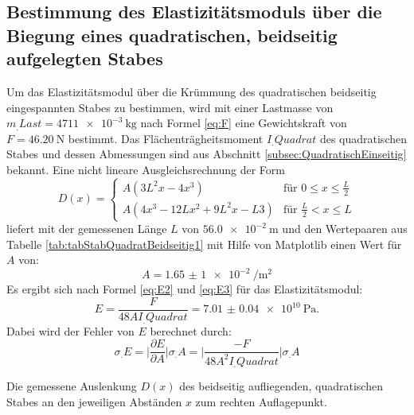 \subsection{Bestimmung des Elastizitätsmoduls über die Biegung eines quadratischen, beidseitig aufgelegten Stabes}

Um das Elastizitätsmodul über die Krümmung des quadratischen beidseitig eingespannten Stabes zu bestimmen, wird mit einer Lastmasse von $m_.{Last} = \SI{4711e-3}{\kilogram}$ nach Formel \eqref{eq:F} eine Gewichtskraft von $F=\SI{46.20}{\newton}$ bestimmt.
Das Flächenträgheitsmoment $I_.{Quadrat}$ des quadratischen Stabes und dessen Abmessungen sind aus Abschnitt \ref{subsec:QuadratischEinseitig} bekannt.
Eine nicht lineare Ausgleichsrechnung der Form
\begin{equation*}
	D(x) =
	\begin{cases}
	A\left(3L^2 x-4x^3\right)& \text{für }0\leq x \leq \frac{L}{2} \\
	A\left(4 x^3 -12 L x^2 + 9 L^2 x -L 3 \right)& \text{für }\frac{L}{2} < x \leq L
	\end{cases} \label{FunktionBeidseitig}
\end{equation*}
liefert mit der gemessenen Länge $L$ von $\SI{56.0e-2}{\metre}$ und den Wertepaaren aus Tabelle \ref{tab:tabStabQuadratBeidseitig1} mit Hilfe von Matplotlib \cite{matplotlib} einen Wert für $A$ von:
\[
	A = \SI{1,65(1)e-2}{\per\metre\squared}
\]
Es ergibt sich nach Formel \eqref{eq:E2} und \eqref{eq:E3} für das Elastizitätsmodul:
\[
	E = \frac{F}{48AI_.{Quadrat}} = \SI{7.01(4)e10}{\pascal}\text{.}
\]
Dabei wird der Fehler von $E$ berechnet durch:
\begin{equation}
	\sigma_.E = \biggl|\frac{\partial E}{\partial A}\biggl|\sigma_.A = \biggl|\frac{-F}{48A^2I_.{Quadrat}}\biggl|\sigma_.A \label{eq:sigma_E}
\end{equation}
\begin{table}
	\caption{Die gemessene Auslenkung $D(x)$ des beidseitig aufliegenden, quadratischen Stabes an den jeweiligen Abständen $x$ zum rechten Auflagepunkt.}
	\begin{minipage}[c]{0.5\textwidth}
		\centering
		
	\end{minipage}
	\begin{minipage}[c]{0.5\textwidth}
		\centering
		
	\end{minipage}
\end{table}
